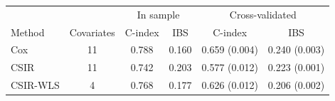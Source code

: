 \begin{tabular}{lccccc}
\toprule
 & & \multicolumn{2}{c}{In sample} & \multicolumn{2}{c}{Cross-validated} \\
Method & Covariates & C-index & IBS & C-index & IBS \\
\midrule
Cox & 11 & 0.788 & 0.160 & 0.659 (0.004) & 0.240 (0.003) \\
CSIR & 11 & 0.742 & 0.203 & 0.577 (0.012) & 0.223 (0.001) \\
CSIR-WLS &  4 & 0.768 & 0.177 & 0.626 (0.012) & 0.206 (0.002) \\
\bottomrule
\end{tabular}
